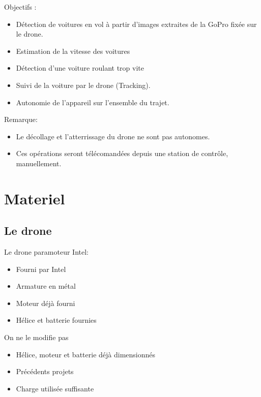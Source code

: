 \documentclass[transparent]{beamer}
\begin{document}
\begin{frame}
	\begin{block}{Objectifs :}
			\begin{itemize}
				\item Détection de voitures en vol à partir d’images extraites de la GoPro fixée sur le drone.
				\item Estimation de la vitesse des voitures
				\item Détection d'une voiture roulant trop vite
				\item Suivi de la voiture par le drone (Tracking).
				\item Autonomie de l'appareil sur l'ensemble du trajet.
			\end{itemize}
	\end{block}
	\begin{block}{Remarque:}
			\begin{itemize}
				\item Le décollage et l’atterrissage du drone ne sont pas autonomes.
				\item Ces opérations seront télécomandées depuis une station de contrôle, manuellement.
			\end{itemize}
	\end{block}
\end{frame}

\section{Materiel}
\subsection{Le drone}

\begin{frame}
	\begin{block}{Le drone paramoteur Intel:}
			\begin{itemize}
				\item Fourni par Intel
				\item Armature en métal
				\item Moteur déjà fourni
				\item Hélice et batterie fournies
			\end{itemize}
	\end{block}
	\begin{block}{On ne le modifie pas}
			\begin{itemize}
				\item Hélice, moteur et batterie déjà dimensionnés
				\item Précédents projets
				\item Charge utilisée suffisante
			\end{itemize}
	\end{block}
\end{frame}
\end{document}

